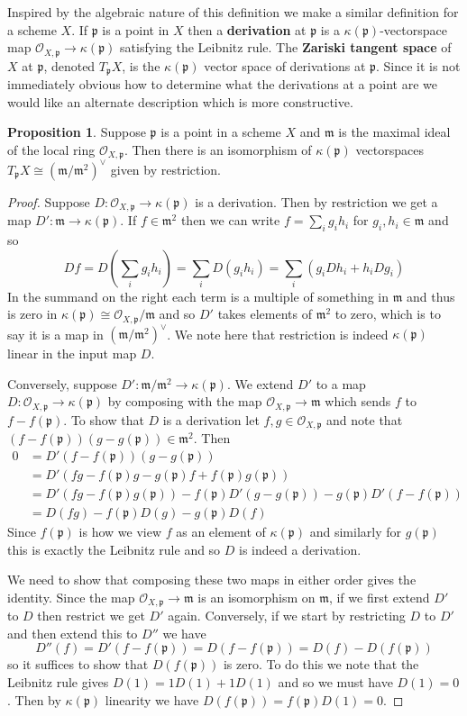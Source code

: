 \documentclass{article}
\newcommand{\p}{\ensuremath{\mathfrak{p}}}
\newcommand{\m}{\ensuremath{\mathfrak{m}}}
\newcommand{\Ox}{\mathscr{O}}
\theoremstyle{definition}
\newcounter{dummy} \numberwithin{dummy}{section}
\newtheorem{prop}[dummy]{Proposition}
\begin{document}
Inspired by the algebraic nature of this definition we make a similar definition for a scheme $X$.
If $\p$ is a point in $X$ then a \textbf{derivation} at $\p$ is a $\kappa(\p)$-vectorspace map $\Ox_{X,\p} \to \kappa(\p)$ satisfying the Leibnitz rule.
The \textbf{Zariski tangent space} of $X$ at $\p$, denoted $T_\p X$, is the $\kappa(\p)$ vector space of derivations at $\p$. Since it is not immediately obvious how to determine what the derivations at a point are we would like an alternate description which is more constructive.
\begin{prop}
  Suppose $\p$ is a point in a scheme $X$ and $\m$ is the maximal ideal of the local ring $\Ox_{X,\p}$. Then there is an isomorphism of $\kappa(\p)$ vectorspaces $T_\p X \cong (\m/\m^2)^\vee$ given by restriction.
\end{prop}
\begin{proof}
  Suppose $D: \Ox_{X,\p} \to \kappa(\p)$ is a derivation.
  Then by restriction we get a map $D': \m \to \kappa(\p)$.
  If $f \in \m^2$ then we can write $f = \sum_i g_ih_i$ for $g_i, h_i \in \m$ and so
  $$ D f = D\left(\sum_i g_ih_i\right)= \sum_i D (g_i h_i) = \sum_i \left( g_i D h_i + h_i Dg_i \right)$$
  In the summand on the right each term is a multiple of something in $\m$ and thus is zero in $\kappa(\p) \cong \Ox_{X,\p}/\m$ and so $D'$ takes elements of $\m^2$ to zero, which is to say it is a map in $(\m/\m^2)^\vee$.
  We note here that restriction is indeed $\kappa(\p)$ linear in the input map $D$.

  Conversely, suppose $D': \m/\m^2 \to \kappa(\p)$.
  We extend $D'$ to a map $D:\Ox_{X,\p} \to \kappa(\p)$ by composing with the map $\Ox_{X,\p} \to \m$ which sends $f$ to $f-f(\p)$.
  To show that $D$ is a derivation let $f,g \in \Ox_{X,\p}$ and note that $(f-f(\p))(g-g(\p)) \in \m^2$.
  Then
  \begin{align*}
    0
    &= D'(f-f(\p))(g-g(\p))\\
    &= D'(fg -f(\p)g -g(\p)f + f(\p)g(\p))\\
    &= D'(fg - f(\p)g(\p)) -f(\p)D'(g-g(\p)) -g(\p)D'(f-f(\p))\\
    &= D(fg) -f(\p)D(g) - g(\p)D(f)
  \end{align*}
  Since $f(\p)$ is how we view $f$ as an element of $\kappa(\p)$ and similarly for $g(\p)$ this is exactly the Leibnitz rule and so $D$ is indeed a derivation.

  We need to show that composing these two maps in either order gives the identity.
  Since the map $\Ox_{X,\p} \to \m$ is an isomorphism on $\m$, if we first extend $D'$ to $D$ then restrict we get $D'$ again.
  Conversely, if we start by restricting $D$ to $D'$ and then extend this to $D''$ we have 
  $$D''(f)=D'(f-f(\p))=D(f-f(\p))=D(f)-D(f(\p))$$
  so it suffices to show that $D(f(\p))$ is zero.
  To do this we note that the Leibnitz rule gives $D(1) = 1 D(1) + 1D(1)$ and so we must have $D(1)=0$.
  Then by $\kappa(\p)$ linearity we have $D(f(\p))= f(\p)D(1)=0$.
\end{proof}
\end{document}
